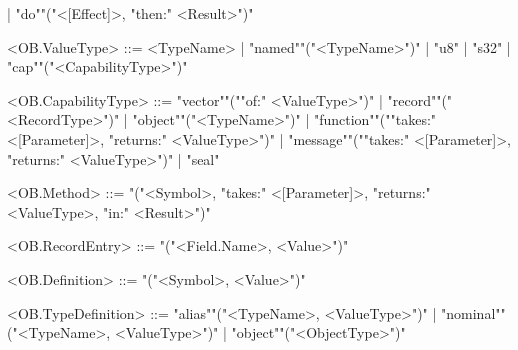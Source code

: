 \documentclass[main.tex]{subfiles}
\begin{document}
\begin{grammar}
						| "do""("<[Effect]>, "then:" <Result>")"
				\par
				<OB.ValueType> ::=
								<TypeName> |
						"named""("<TypeName>")"
						| "u8"
						| "s32"
						| "cap""("<CapabilityType>")"
				\par
				<OB.CapabilityType> ::=
						"vector""(""of:" <ValueType>")"
						| "record""("<RecordType>")"
						| "object""("<TypeName>")"
						| "function""(""takes:" <[Parameter]>, "returns:" <ValueType>")"
						| "message""(""takes:" <[Parameter]>, "returns:" <ValueType>")"
						| "seal"
				\par
				<OB.Method> ::=
							"("<Symbol>, "takes:" <[Parameter]>, "returns:" <ValueType>, "in:" <Result>")"
				\par
				<OB.RecordEntry> ::=
							"("<Field.Name>, <Value>")"
				\par
				<OB.Definition> ::=
							"("<Symbol>, <Value>")"
				\par
				<OB.TypeDefinition> ::=
						"alias""("<TypeName>, <ValueType>")"
						| "nominal""("<TypeName>, <ValueType>")"
						| "object""("<ObjectType>")"
				\par
\end{grammar}
\par
\end{document}
